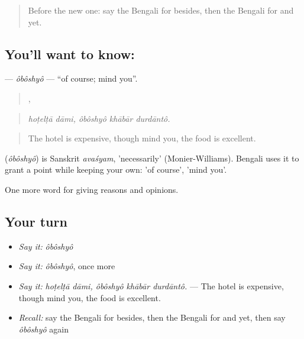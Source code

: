 \label{lesson:BN-C332-oboshyo}



\begin{quote}
Before the new one: say the Bengali for besides, then the Bengali for and yet.
\end{quote}

\subsection*{You'll want to know: }
\textbf{} — \emph{ôbôshyô} — \textquotedblleft{}of course; mind you\textquotedblright{}.

\begin{quote}
 ,   
\end{quote}

\begin{quote}
\emph{hoṭelṭā dāmi, ôbôshyô khābār durdāntô.}
\end{quote}

\begin{quote}
The hotel is expensive, though mind you, the food is excellent.
\end{quote}

\begin{cousinweb}
\textbf{} (\emph{ôbôshyô}) is Sanskrit \emph{avaśyam}, 'necessarily' (Monier-Williams). Bengali uses it to grant a point while keeping your own: 'of course', 'mind you'.
\end{cousinweb}

\begin{grammarlens}[title={What you've built}]
One more word for giving reasons and opinions.
\end{grammarlens}

\subsection*{Your turn}
\begin{itemize}
\raggedright
  \item \emph{Say it:} \emph{ôbôshyô}
  \item \emph{Say it:} \emph{ôbôshyô}, once more
  \item \emph{Say it:} \emph{hoṭelṭā dāmi, ôbôshyô khābār durdāntô.} — The hotel is expensive, though mind you, the food is excellent.
  \item \emph{Recall:} say the Bengali for besides, then the Bengali for and yet, then say \emph{ôbôshyô} again
\end{itemize}


